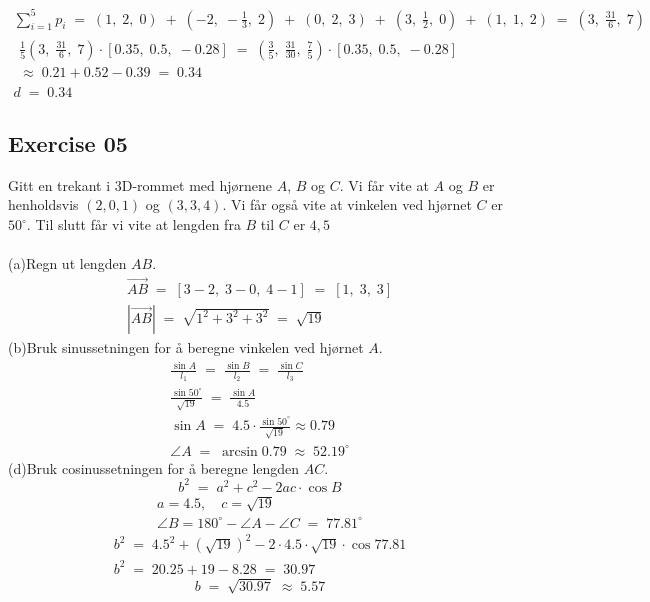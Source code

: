 \documentclass[12pt, a4paper]{article}
\begin{document}
			\begin{gather*}
				\sum_{i=1}^{5}p_i\;=\;
					(1,\;2,\;0)\;+\;\left(
						-2,\;-\frac{1}{3},\;2
					\right)\;+\;
					(0,\;2,\;3)\;+\;
					\left(3,\;\frac{1}{2},\;0\right)\;+\;
					(1,\;1,\;2)\;=\;\left
						(3,\;\frac{31}{6},\;7
					\right)\\
				\begin{aligned}
					\frac{1}{5}\left(
						3,\;\frac{31}{6},\;7
					\right)\cdot[0.35,\;0.5,\;-0.28]\;=\;
					\left(
						\frac{3}{5},\;\frac{31}{30},\;
						\frac{7}{5}
					\right)\cdot[0.35,\;0.5,\;-0.28]
					\;\\\approx\;0.21+0.52-0.39\;=\;0.34
				\end{aligned}\\
				d\;=\;0.34
			\end{gather*}
\subsection*{Exercise 05}
Gitt en trekant i 3D-rommet med hjørnene
$A$, $B$ og $C$. Vi får vite at $A$ og $B$ er henholdsvis $(2, 0, 1)$ og $(3, 3, 4)$. Vi får også
vite at vinkelen ved hjørnet $C$ er $50^\circ$. Til slutt får vi vite at lengden fra $B$ til $C$ er 
$4,5$\\\\
	(a)\quad Regn ut lengden $AB$.
			\begin{gather}
				\tag*{}
					\vec{AB}\;=\;[
						3-2,\;3-0,\;4-1
					]\;=\;[1,\;3,\;3]\\
				\tag*{}
					\left|\vec{AB}\right|\;=\;
					\sqrt{1^2+3^2+3^2}\;=\;\sqrt{19}
			\end{gather}
	(b)\quad Bruk sinussetningen for å beregne vinkelen
	ved hjørnet $A$.
			\begin{gather}
				\tag*{}
					\frac{\sin{A}}{l_1}\;=\;
					\frac{\sin{B}}{l_2}\;=\;
					\frac{\sin{C}}{l_3}\\
				\tag*{}
					\frac{\sin{50^\circ}}{\sqrt{19}}\;=\;
					\frac{\sin{A}}{4.5}\\
				\tag*{}
					\sin{A}\;=\;4.5\cdot
					\frac{\sin{50^\circ}}{\sqrt{19}}
					\approx0.79\\
				\tag*{}
					\angle{A}\;=\;\arcsin{0.79}
					\;\approx\;52.19^\circ
			\end{gather}
	(d)\quad Bruk cosinussetningen for å beregne
	lengden $AC$.
			\begin{equation}
				\tag*{}
					b^2\;=\;a^2+c^2-2ac\cdot\cos{B}
			\end{equation}
			\begin{gather}
				\tag*{}
					a=4.5,\quad c=\sqrt{19}\\
				\tag*{}
					\angle{B}=180^\circ-\angle{A}-\angle{C}
					\;=\;77.81^\circ
			\end{gather}
			\begin{gather}
				\tag*{}
					b^2\;=\;4.5^2+\left(\sqrt{19}\right)^2
						-2\cdot4.5\cdot\sqrt{19}
						\cdot\cos{77.81}\\
				\tag*{}
					b^2\;=\;20.25+19-8.28\;=\;30.97					
			\end{gather}
			\begin{equation}
				\tag*{}
					b\;=\;\sqrt{30.97}\;\approx\;5.57
			\end{equation}
\newpage\quad
\end{document}
